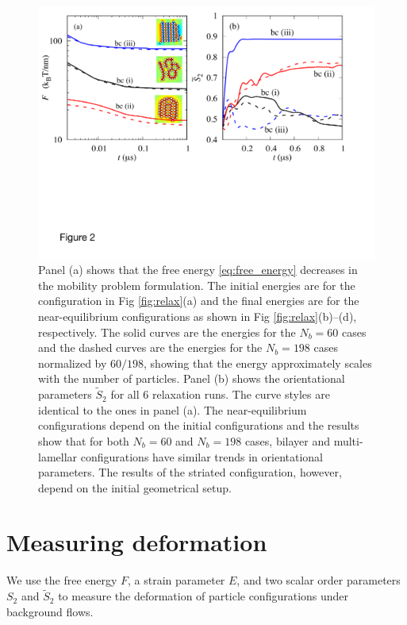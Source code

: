 \documentclass[prb,preprint,showpacs,preprintnumbers,amsmath,amssymb,longbibliography]{revtex4-1}
\begin{document}
\begin{figure}
  \begin{center}
\includegraphics[width=1.0\textwidth]{Figures/Figure2.pdf}
  \end{center}
  \vspace{-20pt}  
  \caption{\label{fig:relax_energy}
  Panel (a) shows that the free energy \eqref{eq:free_energy} decreases
    in the mobility problem formulation.  The initial energies
    are for the configuration in Fig \ref{fig:relax}(a)
    and the final energies are for the near-equilibrium
    configurations as shown in Fig \ref{fig:relax}(b)--(d), respectively.
    The solid curves are the energies for the $N_b=60$ cases and  
    the dashed curves are the energies for the $N_b = 198$ cases normalized
    by $60/198$, showing that the energy approximately scales with the number of
    particles. 
    Panel (b) shows the orientational parameters $\tilde{S}_2$ for all 6 relaxation runs. 
    The curve styles are identical to the ones in panel (a).
    The near-equilibrium configurations depend on the initial configurations and the results show that for both $N_b=60$ and $N_b=198$ cases, bilayer and multi-lamellar configurations have similar trends in orientational parameters.
    The results of the striated configuration, however, depend on the initial geometrical setup.
  }
\end{figure}

\section{Measuring deformation}
We use the free energy $F$,
a strain parameter $E$, 
and two scalar order parameters $S_{2}$ and $\tilde S_2$ to measure
the deformation of particle configurations under background flows. 
\end{document}
